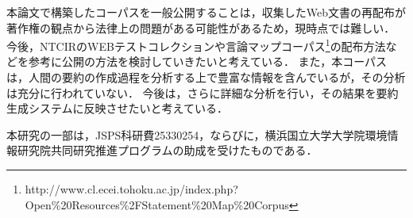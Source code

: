 \documentclass[japanese]{jnlp_1.4}
\begin{document}
{本論文}で構築したコーパスを一般公開することは，収集したWeb文書の再配布が著作権の観点から法律上の問題がある可能性があるため，現時点では難しい．
今後，NTCIRのWEBテストコレクションや言論マップコーパス\footnote{http://www.cl.ecei.tohoku.ac.jp/index.php?Open\%20Resources\%2FStatement\%20Map\%20Corpus}の配布方法などを参考に公開の方法を検討していきたいと考えている．
また，本コーパスは，人間の要約の作成過程を分析する上で豊富な情報を含んでいるが，その分析は充分に行われていない．
今後は，さらに詳細な分析を行い，その結果を要約生成システムに反映させたいと考えている．



\acknowledgment

本研究の一部は，JSPS科研費25330254，ならびに，横浜国立大学大学院環境情報研究院共同研究推進プログラムの助成を受けたものである．
\end{document}
